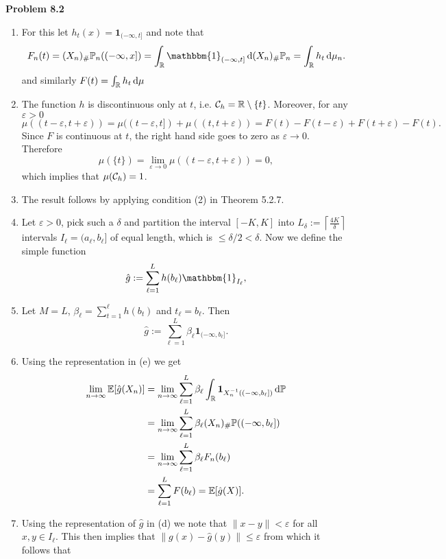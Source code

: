 
\textbf{Problem 8.2}

\begin{enumerate}[label={(\alph*)}]
\item For this let $h_t(x) = \mathbf{1}_{(-\infty,t]}$ and note that 
\[
	F_n(t) = (X_n)_\# \bbP_n ((-\infty,x]) = \int_\bbR \mathbbm{1}_{(-\infty,t]} \, \dd (X_n)_\# \bbP_n
	= \int_\bbR h_t \, \dd \mu_n.
\]
and similarly $F(t) = \int_{\mathbb R} h_t \, \mathrm{d} \mu$
\item The function $h$ is discontinuous only at $t$, i.e. $\mathcal C_h = \mathbb R \setminus \{t\}$. Moreover, for any $\varepsilon > 0$
\[
	\mu((t-\varepsilon, t+\varepsilon)) = \mu((t-\varepsilon,t]) + \mu((t,t+\varepsilon))
	= F(t) - F(t-\varepsilon) + F(t + \varepsilon) - F(t).
\]
Since $F$ is continuous at $t$, the right hand side goes to zero as $\varepsilon \to 0$. Therefore
\[
	\mu(\{t\}) = \lim_{\varepsilon \to 0} \mu((t-\varepsilon, t+\varepsilon)) = 0,
\]
which implies that $\mu(\mathcal C_h) = 1$.
\item The result follows by applying condition (2) in Theorem 5.2.7.
\item Let $\varepsilon > 0$, pick such a $\delta$ and partition the interval $[-K,K]$ into $L_\delta := \left \lceil \frac{4K}{\delta} \right \rceil$ intervals $I_\ell = (a_\ell, b_\ell]$ of equal length, which is $\le \delta/2 < \delta$. Now we define the simple function
\[
	\hat{g} := \sum_{\ell = 1}^L h(b_\ell) \mathbbm{1}_{I_\ell},
\]
\item Let $M=L$, $\beta_\ell = \sum_{t = 1}^\ell h(b_t)$ and $t_\ell = b_\ell$. Then
\[
	\hat{g} := \sum_{\ell = 1}^L \beta_\ell \mathbf{1}_{(-\infty, b_\ell]}.
\]
\item Using the representation in (e) we get
\begin{align*}
	\lim_{n \to \infty} \mathbb E[\hat{g}(X_n)] 
	&= \lim_{n \to \infty} \sum_{\ell = 1}^L \beta_\ell \int_{\mathbb R} \mathbf{1}_{X_n^{-1}((-\infty,b_\ell])} \, \mathrm{d} \mathbb P \\
	&= \lim_{n \to \infty} 	\sum_{\ell = 1}^L \beta_\ell (X_n)_\# \mathbb P ((-\infty, b_\ell]) \\
	&= \lim_{n \to \infty} 	\sum_{\ell = 1}^L \beta_\ell F_n(b_\ell) \\
	&= \sum_{\ell = 1}^L F(b_\ell) = \mathbb E[\hat{g}(X)].
\end{align*}
\item Using the representation of $\hat{g}$ in (d) we note that $\|x - y\| < \varepsilon$ for all $x,y \in I_\ell$. This then implies that $\|g(x) - \hat{g}(y)\| \le \varepsilon$ from which it follows that
\begin{align*}

\end{align*}
\end{enumerate}
